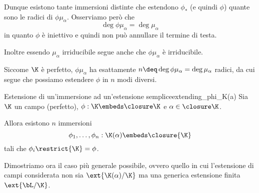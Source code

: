 Dunque esistono tante immersioni distinte che estendono $\phi_\ast$ (e quindi $\phi$) quante sono le radici di $\phi\mu_\alpha$. Osserviamo però che \[
    \deg \phi\mu_\alpha = \deg \mu_\alpha
\] in quanto $\phi$ è iniettivo e quindi non può annullare il termine di testa. 

Inoltre essendo $\mu_\alpha$ irriducibile segue anche che $\phi\mu_\alpha$ è irriducibile. %

Siccome $\K$ è perfetto, $\phi\mu_\alpha$ ha esattamente $n \deq \deg \phi\mu_\alpha = \deg \mu_\alpha$ radici, da cui segue che possiamo estendere $\phi$ in $n$ modi diversi.

\begin{theorem}
    {Estensione di un'immersione ad un'estensione semplice}{extending_phi_K(a)}
    Sia $\K$ un campo (perfetto), $\phi : \K \embeds \closure\K$ e $\alpha \in \closure\K$.

    Allora esistono $n$ immersioni \[
        \phi_1, \dots, \phi_n : \K(\alpha) \embeds \closure{\K}
    \] tali che $\phi_i\restrict{\K} = \phi$.
\end{theorem}

Dimostriamo ora il caso più generale possibile, ovvero quello in cui l'estensione di campi considerata non sia $\ext{\K(\alpha) / \K}$ ma una generica estensione finita $\ext{\bL / \K}$.

